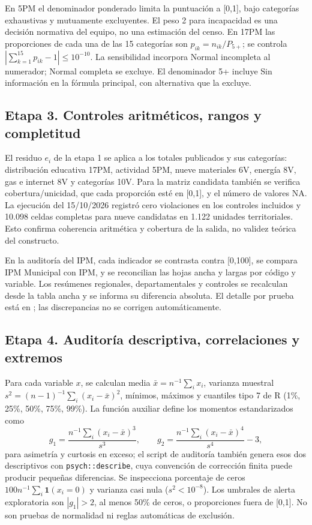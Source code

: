 En 5PM el denominador ponderado limita la puntuación a [0,1], bajo categorías exhaustivas y mutuamente excluyentes. El peso 2 para incapacidad es una decisión normativa del equipo, no una estimación del censo. En 17PM las proporciones de cada una de las 15 categorías son $p_{ik}=n_{ik}/P_{5+}$; se controla $|\sum_{k=1}^{15}p_{ik}-1|\leq10^{-10}$. La sensibilidad incorpora Normal incompleta al numerador; Normal completa se excluye. El denominador 5+ incluye Sin información en la fórmula principal, con alternativa que la excluye.

\subsection{Etapa 3. Controles aritméticos, rangos y completitud}

El residuo $e_i$ de la etapa 1 se aplica a los totales publicados y sus categorías: distribución educativa 17PM, actividad 5PM, nueve materiales 6V, energía 8V, gas e internet 8V y categorías 10V. Para la matriz candidata también se verifica cobertura/unicidad, que cada proporción esté en [0,1], y el número de valores NA. La ejecución del 15/10/2026 registró cero violaciones en los controles incluidos y 10.098 celdas completas para nueve candidatas en 1.122 unidades territoriales. Esto confirma coherencia aritmética y cobertura de la salida, no validez teórica del constructo.

En la auditoría del IPM, cada indicador se contrasta contra [0,100], se compara IPM Municipal con IPM, y se reconcilian las hojas ancha y largas por código y variable. Los resúmenes regionales, departamentales y controles se recalculan desde la tabla ancha y se informa su diferencia absoluta. El detalle por prueba está en ; las discrepancias no se corrigen automáticamente.

\subsection{Etapa 4. Auditoría descriptiva, correlaciones y extremos}

Para cada variable $x$, se calculan media $\bar{x}=n^{-1}\sum_i x_i$, varianza muestral $s^2=(n-1)^{-1}\sum_i(x_i-\bar{x})^2$, mínimos, máximos y cuantiles tipo 7 de R (1\%, 25\%, 50\%, 75\%, 99\%). La función auxiliar define los momentos estandarizados como
\[
g_1=\frac{n^{-1}\sum_i(x_i-\bar{x})^3}{s^3},\qquad
g_2=\frac{n^{-1}\sum_i(x_i-\bar{x})^4}{s^4}-3,
\]
para asimetría y curtosis en exceso; el script de auditoría también genera esos dos descriptivos con \texttt{psych::describe}, cuya convención de corrección finita puede producir pequeñas diferencias. Se inspecciona porcentaje de ceros $100n^{-1}\sum_i\mathbf{1}(x_i=0)$ y varianza casi nula ($s^2<10^{-8}$). Los umbrales de alerta exploratoria son $|g_1|>2$, al menos 50\% de ceros, o proporciones fuera de [0,1]. No son pruebas de normalidad ni reglas automáticas de exclusión.

